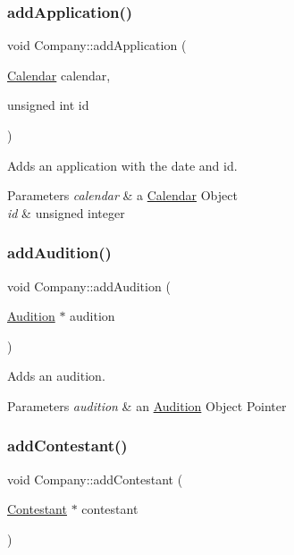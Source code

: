 \subsubsection{\texorpdfstring{add\+Application()}{addApplication()}}
{\footnotesize\ttfamily void Company\+::add\+Application (\begin{DoxyParamCaption}\item[{\hyperlink{class_calendar}{Calendar}}]{calendar,  }\item[{unsigned int}]{id }\end{DoxyParamCaption})}



Adds an application with the date and id. 


\begin{DoxyParams}{Parameters}
{\em calendar} & a \hyperlink{class_calendar}{Calendar} Object \\
\hline
{\em id} & unsigned integer \\
\hline
\end{DoxyParams}
\mbox{\label{class_company_a19096e3cb1b5879774bd17b0c096ffdb}} 
\subsubsection{\texorpdfstring{add\+Audition()}{addAudition()}}
{\footnotesize\ttfamily void Company\+::add\+Audition (\begin{DoxyParamCaption}\item[{\hyperlink{class_audition}{Audition} $\ast$}]{audition }\end{DoxyParamCaption})}



Adds an audition. 


\begin{DoxyParams}{Parameters}
{\em audition} & an \hyperlink{class_audition}{Audition} Object Pointer \\
\hline
\end{DoxyParams}
\mbox{\label{class_company_a8db12922bdf5e3bc1817dd001ca81f7a}} 
\subsubsection{\texorpdfstring{add\+Contestant()}{addContestant()}}
{\footnotesize\ttfamily void Company\+::add\+Contestant (\begin{DoxyParamCaption}\item[{\hyperlink{class_contestant}{Contestant} $\ast$}]{contestant }\end{DoxyParamCaption})}



